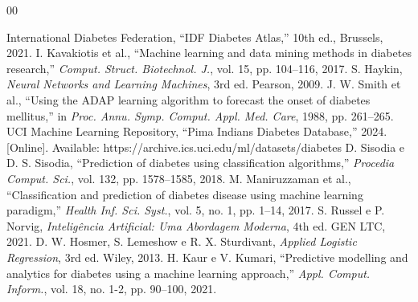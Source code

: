 \documentclass[conference]{IEEEtran}
\begin{document}
\begin{thebibliography}{00}

 International Diabetes Federation, ``IDF Diabetes Atlas,'' 10th ed., Brussels, 2021.
 I. Kavakiotis et al., ``Machine learning and data mining methods in diabetes research,'' \emph{Comput. Struct. Biotechnol. J.}, vol. 15, pp. 104--116, 2017.
 S. Haykin, \emph{Neural Networks and Learning Machines}, 3rd ed. Pearson, 2009.
 J. W. Smith et al., ``Using the ADAP learning algorithm to forecast the onset of diabetes mellitus,'' in \emph{Proc. Annu. Symp. Comput. Appl. Med. Care}, 1988, pp. 261--265.
 UCI Machine Learning Repository, ``Pima Indians Diabetes Database,'' 2024. [Online]. Available: https://archive.ics.uci.edu/ml/datasets/diabetes
 D. Sisodia e D. S. Sisodia, ``Prediction of diabetes using classification algorithms,'' \emph{Procedia Comput. Sci.}, vol. 132, pp. 1578--1585, 2018.
 M. Maniruzzaman et al., ``Classification and prediction of diabetes disease using machine learning paradigm,'' \emph{Health Inf. Sci. Syst.}, vol. 5, no. 1, pp. 1--14, 2017.
 S. Russel e P. Norvig, \emph{Intelig\^{e}ncia Artificial: Uma Abordagem Moderna}, 4th ed. GEN LTC, 2021.
 D. W. Hosmer, S. Lemeshow e R. X. Sturdivant, \emph{Applied Logistic Regression}, 3rd ed. Wiley, 2013.
 H. Kaur e V. Kumari, ``Predictive modelling and analytics for diabetes using a machine learning approach,'' \emph{Appl. Comput. Inform.}, vol. 18, no. 1-2, pp. 90--100, 2021.

\end{thebibliography}
\end{document}
